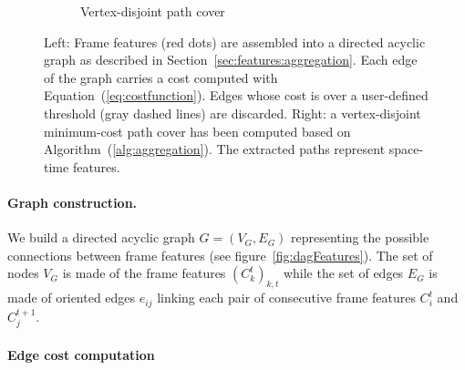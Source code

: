 \begin{figure}[!h]
\begin{subfigure}[b]{0.48\linewidth}
		\caption{\label{fig:aggregatedFeatures}Vertex-disjoint path cover}
	\end{subfigure}
	\caption[Fluid sculpting: Feature aggregation]{
		Left: Frame features (red dots) are assembled into a directed acyclic graph as described in Section~\ref{sec:features:aggregation}.
		Each edge of the graph carries a cost computed with Equation~(\ref{eq:costfunction}). 
		Edges whose cost is over a user-defined threshold (gray dashed lines) are discarded.
		Right: a vertex-disjoint minimum-cost path cover has been computed based on Algorithm~(\ref{alg:aggregation}). 
		The extracted paths represent space-time features.}
	\label{fig:aggregation}
\end{figure}

\paragraph*{Graph construction.}

We build a directed acyclic graph $G = (V_G, E_G) $ representing the possible connections between frame features (see figure~\ref{fig:dagFeatures}).
The set of nodes $V_{G}$ is made of the frame features $\left(C_{k}^{t}\right)_{k,t}$ while the set of edges $E_{G}$ is made of oriented edges $e_{ij}$ linking each pair of consecutive frame features $C_{i}^{t}$ and $C_{j}^{t+1}$.

\paragraph{Edge cost computation}

